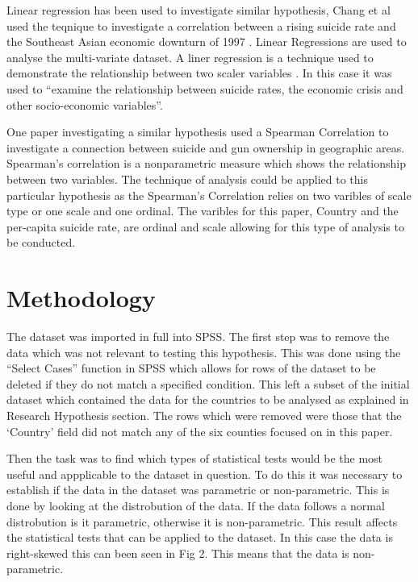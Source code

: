 \documentclass[conference]{IEEEtran}
\begin{document}
Linear regression has been used to investigate similar hypothesis, Chang et al used the teqnique to investigate a 
correlation between a rising suicide rate and the Southeast Asian economic downturn of 1997 \cite{SEAsia_sui}.
Linear Regressions are used to analyse the multi-variate dataset. A liner regression is a technique used to demonstrate the relationship between two scaler variables \cite{stats_models_book}. 
In this case it was used to ``examine the relationship between suicide rates, the economic crisis and other socio-economic variables''\cite{SEAsia_sui}.

One paper investigating a similar hypothesis used a Spearman Correlation to investigate a connection between suicide and gun ownership in geographic areas.
Spearman's correlation is a nonparametric measure which shows the relationship between two variables\cite{gun_sui}.
The technique of analysis could be applied to this particular hypothesis as the Spearman's Correlation relies on two varibles of scale type or one scale and one ordinal.
The varibles for this paper, Country and the per-capita suicide rate, are ordinal and scale allowing for this type of analysis to be conducted.

\section{Methodology}
The dataset was imported in full into SPSS. The first step was to remove the data which was not relevant to testing this hypothesis.
This was done using the ``Select Cases'' function in SPSS which allows for rows of the dataset to be deleted if they do not match a specified condition.
This left a subset of the initial dataset which contained the data for the countries to be analysed as explained in Research Hypothesis section.
The rows which were removed were those that the `Country' field did not match any of the six counties focused on in this paper.

Then the task was to find which types of statistical tests would be the most useful and appplicable to the dataset in question.
To do this it was necessary to establish if the data in the dataset was parametric or non-parametric.
This is done by looking at the distrobution of the data. If the data follows a normal distrobution is it parametric, otherwise it is non-parametric.
This result affects the statistical tests that can be applied to the dataset.
In this case the data is right-skewed this can been seen in Fig 2. This means that the data is non-parametric.
\end{document}
